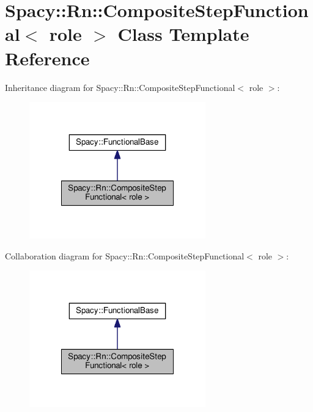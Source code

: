 \hypertarget{classSpacy_1_1Rn_1_1CompositeStepFunctional}{\section{Spacy\-:\-:Rn\-:\-:Composite\-Step\-Functional$<$ role $>$ Class Template Reference}
\label{classSpacy_1_1Rn_1_1CompositeStepFunctional}
}


Inheritance diagram for Spacy\-:\-:Rn\-:\-:Composite\-Step\-Functional$<$ role $>$\-:
\nopagebreak
\begin{figure}[H]
\begin{center}
\leavevmode
\includegraphics[width=216pt]{classSpacy_1_1Rn_1_1CompositeStepFunctional__inherit__graph}
\end{center}
\end{figure}


Collaboration diagram for Spacy\-:\-:Rn\-:\-:Composite\-Step\-Functional$<$ role $>$\-:
\nopagebreak
\begin{figure}[H]
\begin{center}
\leavevmode
\includegraphics[width=216pt]{classSpacy_1_1Rn_1_1CompositeStepFunctional__coll__graph}
\end{center}
\end{figure}
